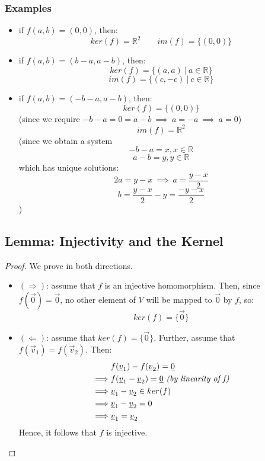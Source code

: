\documentclass{exam}
\begin{document}
\subsubsection{Examples}

\begin{itemize}
    \item if $f(a,b) = (0,0)$, then:
    \[
    ker(f) = \mathbb{R}^2 \qquad im(f) = \{(0,0)\}
    \]
    \item if $f(a,b) = (b-a, a-b)$, then:
    \[
    ker(f) = \{(a,a) \ | \ a \in \mathbb{R}\}
    \]
    \[
    im(f) = \{(c,-c) \ | \ c \in \mathbb{R}\}
    \]
    \item if $f(a,b) = (-b-a, a-b)$, then:
    \[
    ker(f) = \{(0,0) \}
    \]
    (since we require $-b-a = 0 = a - b \ \implies \ a = -a \ \implies \ a = 0$)
    \[
    im(f) = \mathbb{R}^2
    \]
    (since we obtain a system
    \[
    -b - a = x, x \in \mathbb{R}
    \]
    \[
    a - b = y, y \in \mathbb{R}
    \]
    which has unique solutions:
    \[
    2a = y-x \ \implies \ a = \frac{y-x}{2}
    \]
    \[
    b = \frac{y-x}{2} - y = \frac{-y-x}{2}
    \]
    )
\end{itemize}

\subsection{Lemma: Injectivity and the Kernel}


\begin{proof}

We prove in both directions.

\begin{itemize}
    \item $(\Longrightarrow)$: assume that $f$ is an injective homomorphism. Then, since $f(\vec{0}) = \vec{0}$, no other element of $V$ will be mapped to $\vec{0}$ by $f$, so:
    \[
    ker(f) = \{\vec{0}\}
    \]
    \item $(\Longleftarrow)$: assume that $ker(f) = \{\vec{0}\}$. Further, assume that $f(\vec{v}_1) = f(\vec{v}_2)$. Then:
    \begin{align*}
        &f(\vec{v}_1) - f(\vec{v}_2) = \vec{0} \\
        \implies &f(\vec{v}_1 - \vec{v}_2) = \vec{0} \ \text{\textit{(by linearity of f)}}\\
        \implies &\vec{v}_1 - \vec{v}_2 \in ker(f) \\
        \implies &\vec{v}_1 - \vec{v}_2 = 0 \\
        \implies &\vec{v}_1 = \vec{v}_2
    \end{align*}
    Hence, it follows that $f$ is injective.
\end{itemize}

\end{proof}
\end{document}

